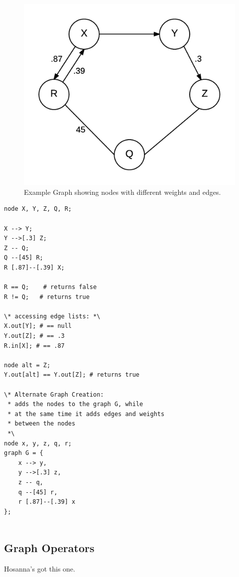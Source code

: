\documentclass{article}
\begin{document}
\begin{figure}[H]
\centering
\includegraphics{graphs/node_operators_example.png}
\caption{Example Graph showing nodes with different weights and edges.}
\label{fig:node-ops}
\end{figure}


\begin{lstlisting}[language=pltLang, caption=Shows the use of node operators that creates the graph in Figure \ref{fig:node_ops}., label=lst:node-ops]
node X, Y, Z, Q, R;

X --> Y;
Y -->[.3] Z;
Z -- Q;
Q --[45] R;
R [.87]--[.39] X;

R == Q;    # returns false
R != Q;   # returns true

\* accessing edge lists: *\
X.out[Y]; # == null
Y.out[Z]; # == .3
R.in[X]; # == .87

node alt = Z;
Y.out[alt] == Y.out[Z]; # returns true

\* Alternate Graph Creation:
 * adds the nodes to the graph G, while
 * at the same time it adds edges and weights
 * between the nodes
 *\
node x, y, z, q, r;
graph G = {
    x --> y,
    y -->[.3] z,
    z -- q,
    q --[45] r,
    r [.87]--[.39] x
};
    

\end{lstlisting}

\subsection{Graph Operators}
Hosanna's got this one.
\end{document}
